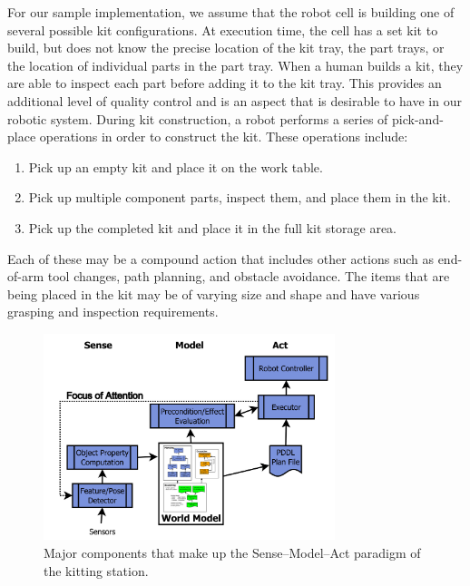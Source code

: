 For our sample implementation, we assume that the robot cell is building one of several possible kit configurations. At execution time, the
cell has a set kit to build, but does not know the precise location of the kit tray, the part trays, or the location of individual parts in the part tray.
When a human builds a kit, they are able to inspect each part before adding it to the kit tray. This provides an additional level of quality control and
is an aspect that is desirable to have in our robotic system. During kit construction,
a robot performs a series of pick-and-place operations
in order to construct the kit. These operations include:
\begin{enumerate}
\item Pick up an empty kit and place it on the work table.
\item Pick up multiple component parts, inspect them, and place them in the kit.
\item Pick up the completed kit and place it in the full kit storage area.
\end{enumerate}
Each of these may be a compound action that includes
other actions such as end-of-arm tool changes, path planning,
and obstacle avoidance. The items that are being placed in the kit may be of varying size and shape and have various grasping and inspection
requirements.
%
\begin{figure}[htb!]
\begin{center}
\includegraphics[width=8.5cm]{images/RITAExecution.jpg}
\caption{Major components that make up the Sense--Model--Act paradigm of the kitting station.}
\label{fig:SenseModelAct}
\end{center}
\end{figure}